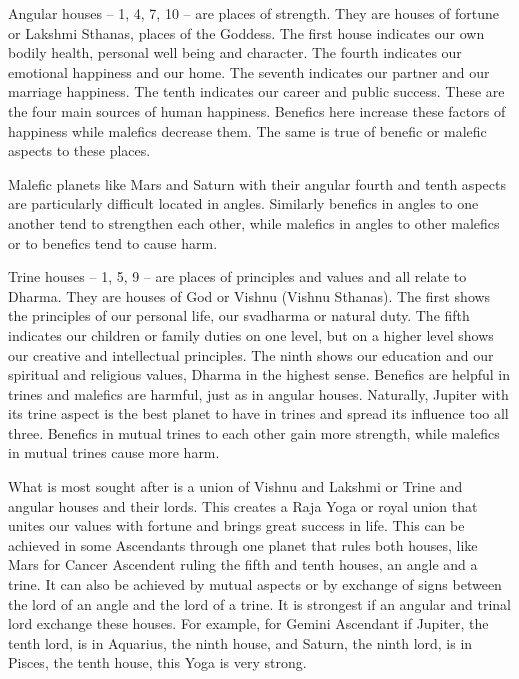 
 

Angular houses – 1, 4, 7, 10 – are places of strength. They are houses of fortune or Lakshmi Sthanas, places of the Goddess. The first house indicates our own bodily health, personal well being and character. The fourth indicates our emotional happiness and our home. The seventh indicates our partner and our marriage happiness. The tenth indicates our career and public success. These are the four main sources of human happiness. Benefics here increase these factors of happiness while malefics decrease them. The same is true of benefic or malefic aspects to these places.

 

Malefic planets like Mars and Saturn with their angular fourth and tenth aspects are particularly difficult located in angles. Similarly benefics in angles to one another tend to strengthen each other, while malefics in angles to other malefics or to benefics tend to cause harm.

 


 

Trine houses – 1, 5,  9 – are places of principles and values and all relate to Dharma. They are houses of God or Vishnu (Vishnu Sthanas). The first shows the principles of our personal life, our svadharma or natural duty. The fifth indicates our children or family duties on one level, but on a higher level shows our creative and intellectual principles. The ninth shows our education and our spiritual and religious values, Dharma in the highest sense. Benefics are helpful in trines and malefics are harmful, just as in angular houses. Naturally, Jupiter with its trine aspect is the best planet to have in trines and spread its influence too all three. Benefics in mutual trines to each other gain more strength, while malefics in mutual trines cause more harm.

 


 

What is most sought after is a union of Vishnu and Lakshmi or Trine and angular houses and their lords. This creates a Raja Yoga or royal union that unites our values with fortune and brings great success in life. This can be achieved in some Ascendants through one planet that rules both houses, like Mars for Cancer Ascendent ruling the fifth and tenth houses, an angle and a trine. It can also be achieved by mutual aspects or by exchange of signs between the lord of an angle and the lord of a trine. It is strongest if an angular and trinal lord exchange these houses. For example, for Gemini Ascendant if Jupiter, the tenth lord, is in Aquarius, the ninth house, and Saturn, the ninth lord, is in Pisces, the tenth house, this Yoga is very strong.


